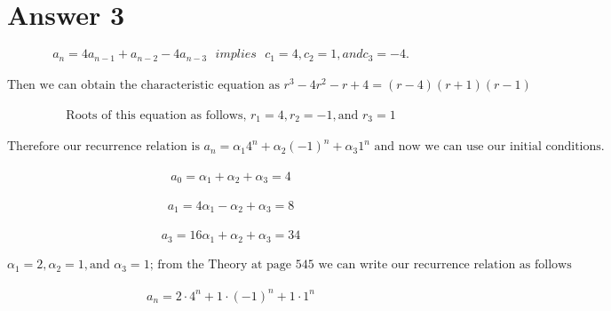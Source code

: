 \documentclass[12pt]{article}
\begin{document}
\section*{Answer 3}
\[a_n = 4a_{n-1} + a_{n-2} - 4a_{n-3} \text{  }implies \text{  } c_1 = 4, c_2 = 1, and c_3 = -4.\]\\
\[\text{Then we can obtain the characteristic equation as } r^3 - 4r^2 - r + 4 = (r-4)(r+1)(r-1)\]\\
\[\text{Roots of this equation as follows, }  r_1 = 4,r_2 = -1, \text{and }r_3 = 1\]\\
\[\text{Therefore our recurrence relation is } a_n = \alpha_{1}4^n + \alpha_{2}(-1)^n + \alpha_{3}1^n \text{ and now we can use our initial conditions.}\]\\
\[a_0 = \alpha_{1} + \alpha_{2} + \alpha_{3} = 4\]\\
\[a_1 = 4\alpha_{1} - \alpha_{2} + \alpha_{3} = 8\]\\
\[a_3 = 16\alpha_{1} + \alpha_{2} + \alpha_{3} = 34\]\\
\[\alpha_{1} = 2, \alpha_{2} = 1, \text{and }\alpha_{3} = 1 \text{; from the Theory at page 545 we can write our recurrence relation as follows}\]\\
\[a_n = 2\cdot4^n + 1\cdot(-1)^n + 1\cdot1^n\]\\
\end{document}
